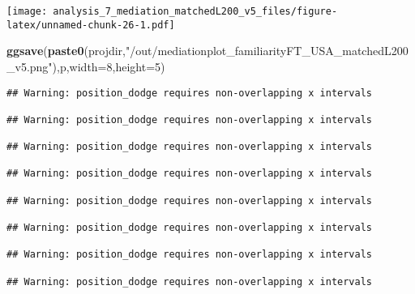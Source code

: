 \documentclass[
]{article}
\newenvironment{Shaded}{\begin{snugshade}}{\end{snugshade}}
\newcommand{\DataTypeTok}[1]{\textcolor[rgb]{0.13,0.29,0.53}{#1}}
\newcommand{\DecValTok}[1]{\textcolor[rgb]{0.00,0.00,0.81}{#1}}
\newcommand{\KeywordTok}[1]{\textcolor[rgb]{0.13,0.29,0.53}{\textbf{#1}}}
\newcommand{\NormalTok}[1]{#1}
\newcommand{\StringTok}[1]{\textcolor[rgb]{0.31,0.60,0.02}{#1}}
\begin{document}
\texttt{[image: analysis\_7\_mediation\_matchedL200\_v5\_files/figure-latex/unnamed-chunk-26-1.pdf]}

\begin{Shaded}
\begin{Highlighting}[]
\KeywordTok{ggsave}\NormalTok{(}\KeywordTok{paste0}\NormalTok{(projdir,}\StringTok{"/out/mediationplot_familiarityFT_USA_matchedL200_v5.png"}\NormalTok{),p,}\DataTypeTok{width=}\DecValTok{8}\NormalTok{,}\DataTypeTok{height=}\DecValTok{5}\NormalTok{)}
\end{Highlighting}
\end{Shaded}

\begin{verbatim}
## Warning: position_dodge requires non-overlapping x intervals

## Warning: position_dodge requires non-overlapping x intervals

## Warning: position_dodge requires non-overlapping x intervals

## Warning: position_dodge requires non-overlapping x intervals

## Warning: position_dodge requires non-overlapping x intervals

## Warning: position_dodge requires non-overlapping x intervals

## Warning: position_dodge requires non-overlapping x intervals

## Warning: position_dodge requires non-overlapping x intervals
\end{verbatim}
\end{document}
